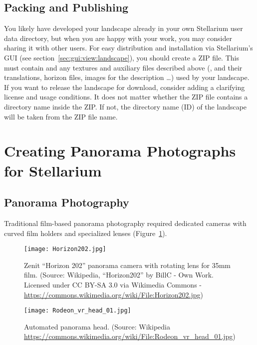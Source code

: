 \subsection{Packing and Publishing}
\label{sec:landscapes:Packing}

You likely have developed your landscape already in your own Stellarium user data directory, but when you are happy with your work,
you may consider sharing it with other users.
For easy distribution and installation via Stellarium's GUI (see section~\ref{sec:gui:view:landscape}), you should create a ZIP file.
This must contain  and any textures and auxiliary files described above (, 
and their translations, horizon files, images for the description  \ldots) used by your landscape.
If you want to release the landscape for download, consider adding a  clarifying license and usage conditions.
It does not matter whether the ZIP file contains a directory name inside the ZIP. If not, the directory name (ID) of the
landscape will be taken from the ZIP file name.


\section{Creating Panorama Photographs for Stellarium}
\label{sec:landscapes:PanoramaPhotography}

\subsection{Panorama Photography}
\label{sec:landscapes:PanoramaPhotography:Photography}

Traditional film-based panorama photography required dedicated cameras with curved
film holders and specialized lenses
(Figure~\ref{fig:landscapes:panoCam}).


\begin{figure}[bp]
  \centering
 \texttt{[image: Horizon202.jpg]}
 \caption{Zenit ``Horizon 202'' panorama camera with rotating lens for
   35mm film. \footnotesize{(Source: Wikipedia, ``Horizon202'' by
     BillC - Own Work. Licensed under CC BY-SA 3.0 via Wikimedia Commons -
     \protect\url{https://commons.wikimedia.org/wiki/File:Horizon202.jpg})}}
  \label{fig:landscapes:panoCam}
\end{figure}



\begin{figure}[tbp]
  \centering
  \texttt{[image: Rodeon\_vr\_head\_01.jpg]}
  \caption{Automated panorama head. \footnotesize{(Source: Wikipedia \protect\url{https://commons.wikimedia.org/wiki/File:Rodeon_vr_head_01.jpg})}}
  \label{fig:landscapes:panoHead}
\end{figure}


